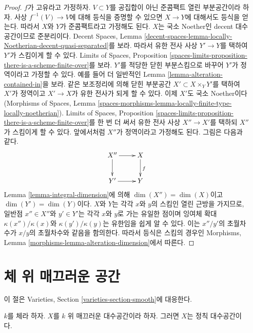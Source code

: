 \begin{proof}
\medskip\noindent
$f$가 고유라고 가정하자. $V \subset Y$를 공집합이 아닌 준콤팩트 열린
부분공간이라 하자. 사상 $f^{-1}(V) \to V$에 대해 등식을 증명할 수 있으면
$X \to Y$에 대해서도 등식을 얻는다. 따라서 $X$와 $Y$가 준콤팩트라고
가정해도 된다. $X$는 국소 Noether인 decent 대수공간이므로 준분리이다.
Decent Spaces, Lemma
\ref{decent-spaces-lemma-locally-Noetherian-decent-quasi-separated}를 보라.
따라서 유한 전사 사상 $Y' \to Y$를 택하여 $Y'$가 스킴이게 할 수 있다.
Limits of Spaces, Proposition
\ref{spaces-limits-proposition-there-is-a-scheme-finite-over}를 보라. $Y'$를
적당한 닫힌 부분스킴으로 바꾸어 $Y'$가 정역이라고 가정할 수 있다. 예를 들어
더 일반적인 Lemma \ref{lemma-alteration-contained-in}을 보라. 같은 보조정리에
의해 닫힌 부분공간 $X' \subset X \times_Y Y'$를 택하여 $X'$가 정역이고
$X' \to X$가 유한 전사가 되게 할 수 있다. 이제 $X'$도 국소 Noether이다
(Morphisms of Spaces, Lemma
\ref{spaces-morphisms-lemma-locally-finite-type-locally-noetherian}). Limits of
Spaces, Proposition
\ref{spaces-limits-proposition-there-is-a-scheme-finite-over}를 한 번 더 써서
유한 전사 사상 $X'' \to X'$를 택하되 $X''$가 스킴이게 할 수 있다.
앞에서처럼 $X''$가 정역이라고 가정해도 된다. 그림은 다음과 같다.
$$
\xymatrix{
X'' \ar[d] \ar[r] & X \ar[d]^f \\
Y' \ar[r] & Y
}
$$
Lemma \ref{lemma-integral-dimension}에 의해
$\dim(X'') = \dim(X)$이고 $\dim(Y') = \dim(Y)$이다. $X$와 $Y$는 각각
$x$와 $y$의 스킴인 열린 근방을 가지므로, 일반점 $x'' \in X''$와
$y' \in Y'$는 각각 $x$와 $y$로 가는 유일한 점이며 잉여체 확대
$\kappa(x'')/\kappa(x)$와 $\kappa(y')/\kappa(y)$는 유한임을 쉽게 알 수
있다. 이는 $x''/y'$의 초월차수가 $x/y$의 초월차수와 같음을 함의한다.
따라서 등식은 스킴의 경우인 Morphisms, Lemma
\ref{morphisms-lemma-alteration-dimension}에서 따른다.
\end{proof}





\section{체 위 매끄러운 공간}
\label{section-smooth}

\noindent
이 절은 Varieties, Section \ref{varieties-section-smooth}에 대응한다.

\begin{lemma}
\label{lemma-smooth-regular}
$k$를 체라 하자.
$X$를 $k$ 위 매끄러운 대수공간이라 하자. 그러면 $X$는 정칙
대수공간이다.
\end{lemma}

